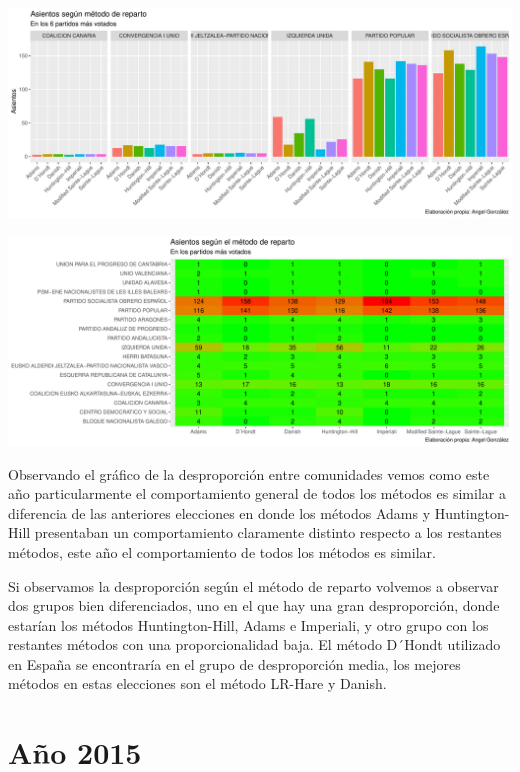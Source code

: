 \documentclass[12pt,a4paper,]{book}
\numberwithin{dummy}{section}
\theoremstyle{ocrenumbox}
\theoremstyle{blacknumex}
\theoremstyle{blacknumbox}
\theoremstyle{ocrenum}
\theoremstyle{ocrenum}
\begin{document}
\begin{center}\includegraphics[width=1\linewidth]{figurasR/unnamed-chunk-104-1} \end{center}

\begin{center}\includegraphics[width=1\linewidth]{figurasR/unnamed-chunk-104-2} \end{center}

Observando el gráfico de la desproporción entre comunidades vemos como
este año particularmente el comportamiento general de todos los métodos
es similar a diferencia de las anteriores elecciones en donde los
métodos Adams y Huntington-Hill presentaban un comportamiento claramente
distinto respecto a los restantes métodos, este año el comportamiento de
todos los métodos es similar.

Si observamos la desproporción según el método de reparto volvemos a
observar dos grupos bien diferenciados, uno en el que hay una gran
desproporción, donde estarían los métodos Huntington-Hill, Adams e
Imperiali, y otro grupo con los restantes métodos con una
proporcionalidad baja. El método D´Hondt utilizado en España se
encontraría en el grupo de desproporción media, los mejores métodos en
estas elecciones son el método LR-Hare y Danish.

\hypertarget{auxf1o-2015}{%
\section{Año 2015}\label{auxf1o-2015}}
\end{document}
